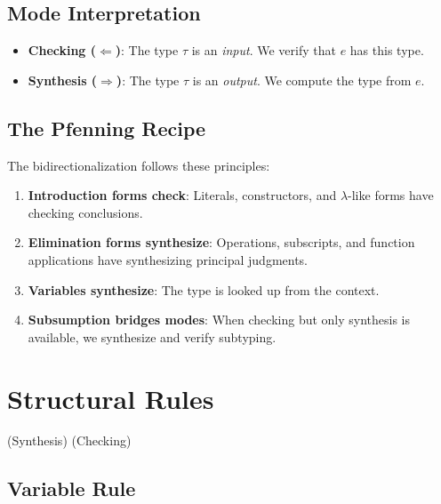 \documentclass[11pt]{article}
\newcommand{\checks}{\Leftarrow}
\newcommand{\synth}{\Rightarrow}
\begin{document}
\subsection{Mode Interpretation}

\begin{itemize}
\item \textbf{Checking ($\checks$)}: The type $\tau$ is an \emph{input}. We verify that $e$ has this type.
\item \textbf{Synthesis ($\synth$)}: The type $\tau$ is an \emph{output}. We compute the type from $e$.
\end{itemize}

\subsection{The Pfenning Recipe}

The bidirectionalization follows these principles:

\begin{enumerate}
\item \textbf{Introduction forms check}: Literals, constructors, and $\lambda$-like forms
      have checking conclusions.
\item \textbf{Elimination forms synthesize}: Operations, subscripts, and function applications
      have synthesizing principal judgments.
\item \textbf{Variables synthesize}: The type is looked up from the context.
\item \textbf{Subsumption bridges modes}: When checking but only synthesis is available,
      we synthesize and verify subtyping.
\end{enumerate}

\section{Structural Rules}

\fbox{$\Gamma; m \vdash e \synth \tau$} \quad (Synthesis)
\hspace{1cm}
\fbox{$\Gamma; m \vdash e \checks \tau$} \quad (Checking)

\subsection{Variable Rule}
\end{document}
